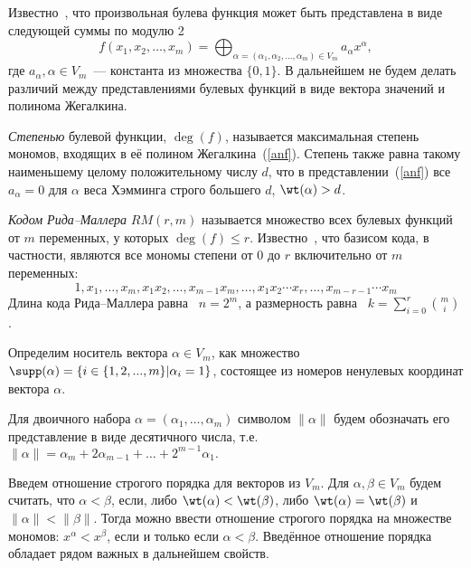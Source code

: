 Известно~\cite{mcwilliams1979theory}, что произвольная булева функция может быть представлена в виде следующей суммы по модулю 2
\begin{equation}
	\label{anf}
	f(x_{{1}},x_2,\ldots,x_m)=\bigoplus_{\alpha=(\alpha_{1},\alpha_2,\ldots,\alpha_m)\in V_m}a_{\alpha}x^{\alpha},
\end{equation}
где \(a_{\alpha}, \alpha\in V_m\)~--- константа из множества $\{0,1\}$.
В дальнейшем не будем делать различий между представлениями булевых функций в виде вектора значений и полинома Жегалкина.

\emph{Степенью} булевой функции, $\deg(f)$, называется максимальная степень мономов, входящих в её полином Жегалкина~(\ref{anf}).
Степень также равна такому наименьшему целому положительному числу \(d\), что в представлении~(\ref{anf}) все \(a_{\alpha}=0\) для \(\alpha\) веса Хэмминга строго большего \(d\), \(\wt(\alpha)> d\).

\emph{Кодом Рида--Маллера} \(RM(r,m)\) называется множество всех булевых функций от \(m\) переменных, у которых \(\deg(f)\leqslant r\).
Известно~\cite{mcwilliams1979theory}, что базисом кода, в частности, являются все мономы степени от 0 до \(r\) включительно от \(m\) переменных:
\begin{equation}
	\label{BasesRM}
	1, x_1,\ldots ,x_{m},x_1x_2,\ldots,x_{m-1}x_m,\ldots,x_{1}x_2\cdots x_r,\ldots,x_{m-r-1}\cdots x_m
\end{equation}
Длина кода Рида--Маллера равна~\cite{mcwilliams1979theory} \(n=2^m\), а размерность равна~\cite{mcwilliams1979theory} $k=\sum_{i=0}^{r}{{m}\choose{i}}$.

Определим носитель вектора $\alpha\in V_m$, как множество $\supp(\alpha)=\{i\in \{1,2,...,m\} | \alpha_i = 1\}$, состоящее из номеров ненулевых координат вектора $\alpha$.

Для двоичного набора \(\alpha=(\alpha_{1},\ldots,\alpha_{m})\) символом \(\|\alpha\|\) будем обозначать его представление в виде десятичного числа, т.е.
$\|\alpha\|=\alpha_{m}+2\alpha_{m-1}+\ldots+2^{m-1}\alpha_{1}.$

Введем отношение строгого порядка для векторов из $V_m$.
Для $\alpha,\beta \in V_m$ будем считать, что $\alpha < \beta$, если, либо $\wt(\alpha) < \wt(\beta)$, либо $\wt(\alpha) = \wt(\beta)$ и $\|\alpha\| < \|\beta\|$.
Тогда можно ввести отношение строгого порядка на множестве мономов: $x^{\alpha}<x^{\beta}$, если и только если $\alpha<\beta$.
Введённое отношение порядка обладает рядом важных в дальнейшем свойств.

